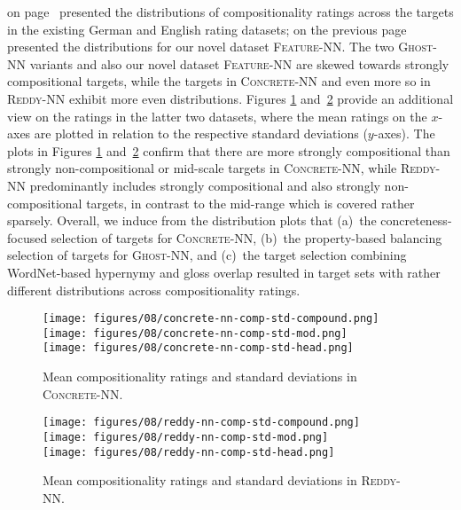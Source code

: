 \documentclass[output=paper,colorlinks,citecolor=brown]{langscibook}
\begin{document}
 on page~\pageref{page:comp-ratings} presented the distributions of compositionality ratings across the targets in the existing German and English rating datasets;  on the previous page presented the distributions for our novel dataset \textsc{Feature-NN}. The two \textsc{Ghost-NN} variants and also our novel dataset \textsc{Feature-NN} are skewed towards strongly compositional targets, while the targets in \textsc{Concrete-NN} and even more so in \textsc{Reddy-NN} exhibit more even distributions. Figures \ref{fig:concrete-comp-std} and~\ref{fig:reddy-comp-std} provide an additional view on the ratings in the latter two datasets, where the mean ratings on the $x$-axes are plotted in relation to the respective standard deviations ($y$-axes). The plots in Figures \ref{fig:concrete-comp-std} and~\ref{fig:reddy-comp-std} confirm that there are more strongly compositional than strongly non-compositional or mid-scale targets in \textsc{Concrete-NN}, while \textsc{Reddy-NN} predominantly includes strongly compositional and also strongly non-compositional targets, in contrast to the mid-range which is covered rather sparsely. Overall, we induce from the distribution plots that (a)~the concreteness-focused selection of targets for \textsc{Concrete-NN}, (b)~the property-based balancing selection of targets for \textsc{Ghost-NN}, and (c)~the target selection combining WordNet-based hypernymy and gloss overlap resulted in target sets with rather different distributions across compositionality ratings.

\begin{figure}[p]
    \texttt{[image: figures/08/concrete-nn-comp-std-compound.png]}\\
    \texttt{[image: figures/08/concrete-nn-comp-std-mod.png]}\\
    \texttt{[image: figures/08/concrete-nn-comp-std-head.png]}%
    \caption{Mean compositionality ratings and standard deviations in \textsc{Concrete-NN}.}
    \label{fig:concrete-comp-std}
\end{figure}

\begin{figure}[p]
    \texttt{[image: figures/08/reddy-nn-comp-std-compound.png]}\\
    \texttt{[image: figures/08/reddy-nn-comp-std-mod.png]}\\
    \texttt{[image: figures/08/reddy-nn-comp-std-head.png]}%
    \caption{Mean compositionality ratings and standard deviations in \textsc{Reddy-NN}.}
    \label{fig:reddy-comp-std}
\end{figure}
\end{document}

